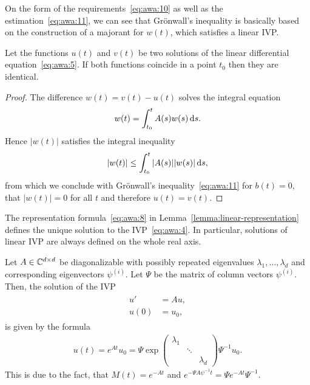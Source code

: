 
\begin{remark}
	On the form of the requirements~\eqref{eq:awa:10} as well as the
  estimation~\eqref{eq:awa:11}, we can see that Grönwall's
  inequality is basically based on the construction of a majorant for 
	$w(t)$, which satisfies a linear IVP.
\end{remark}

\begin{corollary}
  \label{corollary:awa:unique-linear}
  Let the functions $u(t)$ and $v(t)$ be two solutions of the linear
  differential equation~\eqref{eq:awa:5}. If both functions
  coincide in a point $t_0$ then they are identical.
\end{corollary}

\begin{proof}
	The difference $w(t) = v(t) - u(t)$ solves the integral equation
  \begin{gather*}
    w(t) = \int_{t_0}^t A(s) w(s) \,\mathrm{d} s.
  \end{gather*}
  Hence $|w(t)|$ satisfies the integral inequality
  \begin{gather*}
    |w(t)| \le \int_{t_0}^t |A(s)| |w(s)| \,\mathrm{d} s,
  \end{gather*}
	from which we conclude with Grönwall's inequality~\eqref{eq:awa:11} 
	for $b(t) = 0$, that $|w(t)|=0$ for all $t$ and therefore
  $u(t) = v(t)$.
\end{proof}

\begin{corollary}
  The representation formula~\eqref{eq:awa:8} in
  Lemma~\ref{lemma:linear-representation} defines the unique solution to the
  IVP~\eqref{eq:awa:4}. In particular, solutions of linear IVP are
  always defined on the whole real axis.
\end{corollary}

\begin{example}
  Let $A \in \mathbb C^{d\times d}$ be diagonalizable with possibly repeated
  eigenvalues $\lambda_1,\dots,\lambda_d$ and corresponding
  eigenvectors $\psi^{(i)}$. Let $\Psi$ be the matrix of column
  vectors $\psi^{(i)}$. Then, the solution of the IVP
  \begin{gather*}
    \begin{split}
      u' &= A u,\\
      u(0) &= u_0,
    \end{split}
  \end{gather*}
  is given by the formula
  \begin{gather*}
    u(t) = e^{At} u_0 = \Psi \exp
    \begin{pmatrix}
      \lambda_1\\&\ddots\\&&\lambda_d
    \end{pmatrix}
    \Psi^{-1} u_0.
  \end{gather*}
  This is due to the fact, that $M(t) = e^{-At}$ and $e^{-\Psi A
    \psi^{-1}t} = \Psi e^{-At} \Psi^{-1}$.
\end{example}

